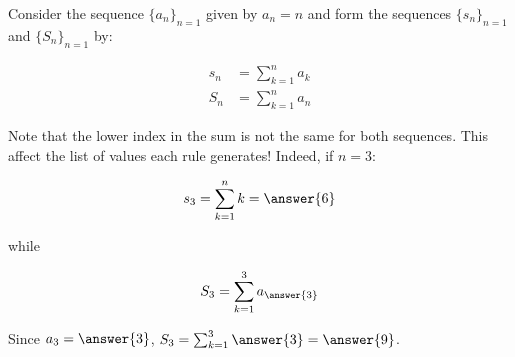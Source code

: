 \documentclass{ximera}
\author{Jim Talamo}
\begin{document}
\begin{exercise}

Consider the sequence $\{a_n\}_{n=1}$ given by $a_n = n$ and form the sequences $\{s_n\}_{n=1}$ and $\{S_n\}_{n=1}$ by:

\begin{align*}
s_n &= \sum_{k=1}^n a_k \\
S_n &= \sum_{k=1}^n a_n
\end{align*}

\begin{multipleChoice}
\end{multipleChoice}

Note that the lower index in the sum is not the same for both sequences. This affect the list of values each rule generates!  Indeed, if $n=3$:

\[
s_3 = \sum_{k=1}^n k = \answer{6}
\]

while

\[
S_3 = \sum_{k=1}^{3} a_{\answer{3}} 
\]

\begin{exercise}
Since $a_3 = \answer{3}$, $S_3= \sum_{k=1}^{3} \answer{3}=  \answer{9}$.
\end{exercise}
\end{exercise}
\end{document}
